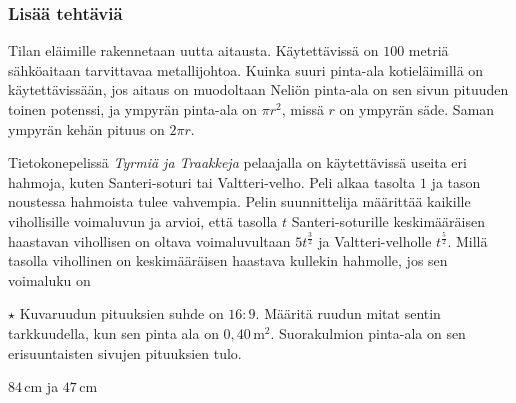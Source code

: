 \begin{tehtavasivu}
\subsubsection*{Lisää tehtäviä}

\begin{tehtava}%
Tilan eläimille rakennetaan uutta aitausta. Käytettävissä on $100$ metriä sähköaitaan tarvittavaa metallijohtoa. Kuinka suuri pinta-ala kotieläimillä on käytettävissään, jos aitaus on muodoltaan
Neliön pinta-ala on sen sivun pituuden toinen potenssi, ja ympyrän pinta-ala on $\pi r^2$, missä $r$ on ympyrän säde. Saman ympyrän kehän pituus on $2\pi r$.
\begin{vastaus}
\end{vastaus}
\end{tehtava}

\begin{tehtava}
Tietokonepelissä \emph{Tyrmiä ja Traakkeja} pelaajalla on käytettävissä useita eri hahmoja, kuten Santeri-soturi tai Valtteri-velho. Peli alkaa tasolta $1$ ja tason noustessa hahmoista tulee vahvempia. Pelin suunnittelija määrittää kaikille vihollisille voimaluvun ja arvioi, että tasolla $t$ Santeri-soturille keskimääräisen haastavan vihollisen on oltava voimaluvultaan $5t^{\frac{3}{2}}$ ja Valtteri-velholle $t^{\frac{5}{2}}$. Millä tasolla vihollinen on keskimääräisen haastava kullekin hahmolle, jos sen voimaluku on
\begin{vastaus}
\end{vastaus}
\end{tehtava}

\begin{tehtava}
$\star$ Kuvaruudun pituuksien suhde on $16:9$. Määritä ruudun mitat sentin tarkkuudella, kun sen pinta ala on $0,40\,\mathrm{m}^2$. Suorakulmion pinta-ala on sen erisuuntaisten sivujen pituuksien tulo.
\begin{vastaus}
$84\,$cm ja $47$\,cm
\end{vastaus}
\end{tehtava}


\end{tehtavasivu}
